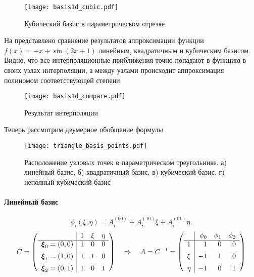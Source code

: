 \begin{figure}[h!]
\centering
\texttt{[image: basis1d\_cubic.pdf]}
\caption{Кубический базис в параметрическом отрезке}
\label{fig:basis1d_cubic}
\end{figure}

На  представлено сравнение результатов
аппроксимации функции $f(x) = -x + \sin(2 x + 1)$ линейным, квадратичным и кубическим базисом.
Видно, что все интерполяционные приближения точно попадают в функцию в своих
узлах интерполяции, а между узлами происходит аппроксимация полиномом соответствующей степени.

\begin{figure}[h!]
\centering
\texttt{[image: basis1d\_compare.pdf]}
\caption{Результат интерполяции}
\label{fig:basis1d_compare}
\end{figure}

Теперь рассмотрим двумерное обобщение формулы
\begin{figure}[h!]
\centering
\texttt{[image: triangle\_basis\_points.pdf]}
\caption{Расположение узловых точек в параметрическом треугольнике. а) линейный базис, б) квадратичный базис, в) кубический базис, г) неполный кубический базис}
\label{fig:triangle_basis_points}
\end{figure}
\paragraph{Линейный базис}

\begin{equation*}
\phi_i(\xi, \eta) = A_i^{(00)} + A_i^{(10)} \xi + A_i^{(01)} \eta.
\end{equation*}
\begin{equation*}
C = \left(
\begin{array}{l|ccc}
                  & 1   & \xi & \eta \\
\hline
\boldsymbol{\rm \xi}_0=(0, 0) & 1   & 0   & 0    \\[5pt]
\boldsymbol{\rm \xi}_1=(1, 0) & 1   & 1   & 0    \\[5pt]
\boldsymbol{\rm \xi}_2=(0, 1) & 1   & 0   & 1
\end{array}
\right)
\quad\Rightarrow\quad
A = C^{-1} = 
\left(
\begin{array}{l|rrr}
     & \phi_0 & \phi_1 & \phi_2 \\
\hline
1    & 1      & 0      & 0      \\[5pt]
\xi  &-1      & 1      & 0      \\[5pt]
\eta &-1      & 0      & 1
\end{array}
\right)
\end{equation*}


